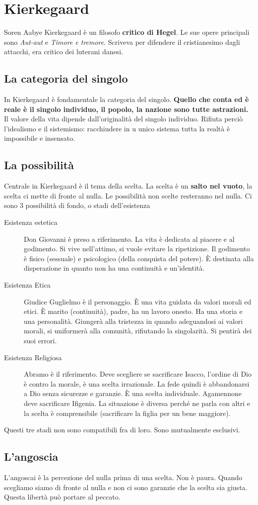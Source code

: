 
\section{Kierkegaard}
Soren Aabye Kierkegaard è un filosofo \textbf{critico di Hegel}. Le sue opere principali sono
\textit{Aut-aut} e \textit{Timore e tremore}. Scriveva per difendere il cristianesimo dagli attacchi,
era critico dei luterani danesi.

\subsection{La categoria del singolo}
In Kierkegaard è fondamentale la categoria del singolo. \textbf{Quello che conta ed è reale è il 
singolo individuo, il popolo, la nazione sono tutte astrazioni.} Il valore della vita dipende 
dall'originalità del singolo individuo. Rifiuta perciò l'idealismo e il sistemismo: racchiudere in u
unico sistema tutta la realtà è impossibile e insensato.

\subsection{La possibilità}
Centrale in Kierkegaard è il tema della scelta. La scelta è un \textbf{salto nel vuoto}, la scelta
ci mette di fronte al nulla. Le possibilità non scelte resteranno nel nulla. Ci sono 3 possibilità
di fondo, o stadi dell'esistenza
\begin{description}
  \item[Esistenza estetica] Don Giovanni è preso a riferimento. La vita è dedicata al piacere e al
    godimento. Si vive nell'attimo, si vuole evitare la ripetizione. Il godimento è fisico (sessuale)
    e psicologico (della conquista del potere). È destinata alla disperazione in quanto non ha una
    continuità e un'identità.
  \item[Esistenza Etica] Giudice Guglielmo è il personaggio. È una vita guidata da valori morali ed
    etici. È marito (continuità), padre, ha un lavoro onesto. Ha una storia e una personalità. 
    Giungerà alla tristezza in quando adeguandosi ai valori morali, si uniformerà alla comunità,
    rifiutando la singolarità. Si pentirà dei suoi errori.
  \item[Esistenza Religiosa] Abramo è il riferimento. Deve scegliere se sacrificare Isacco, l'ordine
    di Dio è contro la morale, è una scelta irrazionale. La fede quindi è abbandonarsi a Dio senza
    sicurezze e garanzie. È una scelta individuale. Agamennone deve sacrificare Ifigenia. La 
    situazione è diversa perché ne parla con altri e la scelta è comprensibile (sacrificare la figlia
    per un bene maggiore).
\end{description}
Questi tre stadi non sono compatibili fra di loro. Sono mutualmente esclusivi.

\subsection{L'angoscia}
L'angoscai è la percezione del nulla prima di una scelta. Non è paura. Quando scegliamo siamo di 
fronte al nulla e non ci sono garanzie che la scelta sia giusta. Questa libertà può portare al 
peccato.
